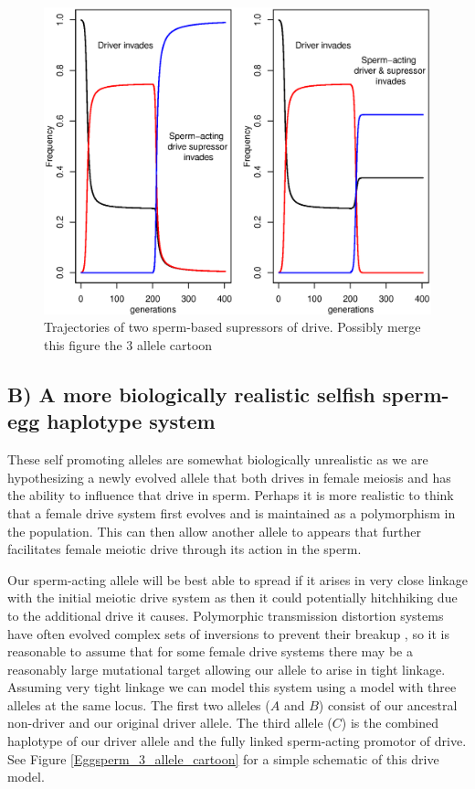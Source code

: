 \documentclass[12pt,letterpaper]{article}
\begin{document}
\begin{figure}
\includegraphics[width = 0.8 \textwidth]{Figures/trajectories_of_sperm_based_supressors.eps} 
\caption{Trajectories of two sperm-based supressors of drive. Possibly
merge this figure the 3 allele cartoon}  \label{Trajectories_of_supressors}
\end{figure}

\subsection*{B) A more biologically realistic selfish sperm-egg haplotype system}
These self promoting alleles are somewhat biologically unrealistic as
we are hypothesizing a newly evolved allele  
that both drives in female meiosis and has the ability to influence that drive in sperm.
Perhaps it is more realistic to think that a female drive system first
evolves and is maintained as a polymorphism in the population. 
This can then allow another allele to appears that further facilitates
female meiotic drive through its action in the sperm. 

Our sperm-acting allele will be best able to spread if it arises in very close
linkage with the initial meiotic drive system as then it could potentially
hitchhiking due to the additional drive it causes. Polymorphic transmission distortion systems
have often evolved complex sets of inversions to prevent their breakup
\citep{XXX}, so it is reasonable to assume that for some female drive
systems there may be a reasonably large mutational target allowing our
allele to arise in tight linkage. Assuming very tight linkage we can
model this system using a model with three alleles at the same
locus. The first two alleles ($A$ and $B$) consist of our ancestral non-driver and
our original driver allele. The third allele ($C$) is the 
combined haplotype of our driver allele and the fully linked
sperm-acting promotor of drive.
 See Figure
\ref{Eggsperm_3_allele_cartoon} for a simple schematic of this drive model.  
\end{document}
